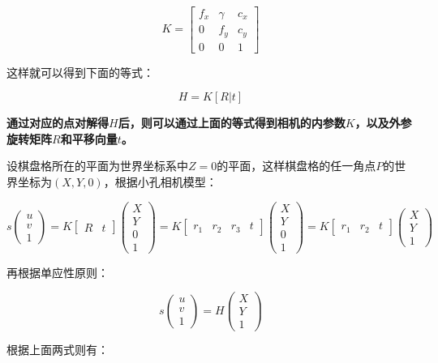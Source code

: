 \documentclass{lzureport}
\begin{document}
$$
K=\begin{bmatrix}
	f_x&\gamma&c_x\\
	0&f_y&c_y\\
   0&0&1
   \end{bmatrix}
$$

这样就可以得到下面的等式：

$$
H=K[R|t]
$$

\textbf{通过对应的点对解得$H$后，则可以通过上面的等式得到相机的内参数$K$，以及外参旋转矩阵$R$和平移向量$t$。}

设棋盘格所在的平面为世界坐标系中$Z=0$的平面，这样棋盘格的任一角点$P$的世界坐标为$(X,Y,0)$，根据小孔相机模型：

$$
s\begin{pmatrix}
	u \\
	v \\
	1
	\end{pmatrix}=K\begin{bmatrix}
	 R & t
	\end{bmatrix}\begin{pmatrix}
	X \\
	Y \\
	0 \\
	1
	\end{pmatrix}=K\begin{bmatrix}
	 r_1 & r_2 & r_3 & t
	\end{bmatrix}\begin{pmatrix}
	X \\
	Y \\
	0 \\
	1
	\end{pmatrix}=K\begin{bmatrix}
	 r_1 & r_2 &  t
	\end{bmatrix}\begin{pmatrix}
	X \\
	Y \\
	1
\end{pmatrix}
$$

再根据单应性原则：

$$
s\begin{pmatrix}
	u \\
	v \\
	1
	\end{pmatrix}=H\begin{pmatrix}
	X \\
	Y \\
	1
\end{pmatrix}
$$

根据上面两式则有：
\end{document}
